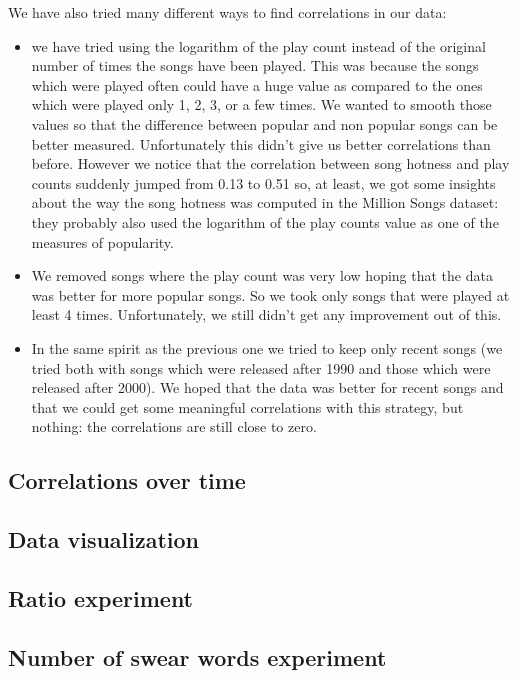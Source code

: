 \documentclass[11pt]{article}
\begin{document}
We have also tried many different ways to find correlations in our data: 

\begin{itemize}
\item we have tried using the logarithm of the play count instead of the original number of times the songs have been played. This was because the songs which were played often could have a huge value as compared to the ones which were played only 1, 2, 3, or a few times. We wanted to smooth those values so that the difference between popular and non popular songs can be better measured. Unfortunately this didn't give us better correlations than before. However we notice that the correlation between song hotness and play counts suddenly jumped from 0.13 to 0.51 so, at least, we got some insights about the way the song hotness was computed in the Million Songs dataset: they probably also used the logarithm of the play counts value as one of the measures of popularity.
\item We removed songs where the play count was very low hoping that the data was better for more popular songs. So we took only songs that were played at least 4 times. Unfortunately, we still didn't get any improvement out of this.
\item In the same spirit as the previous one we tried to keep only recent songs (we tried both with songs which were released after 1990 and those which were released after 2000). We hoped that the data was better for recent songs and that we could get some meaningful correlations with this strategy, but nothing: the correlations are still close to zero.
 \end{itemize}


\subsection{Correlations over time}

\subsection{Data visualization}

\subsection{Ratio experiment}

\subsection{Number of swear words experiment}
\end{document}
